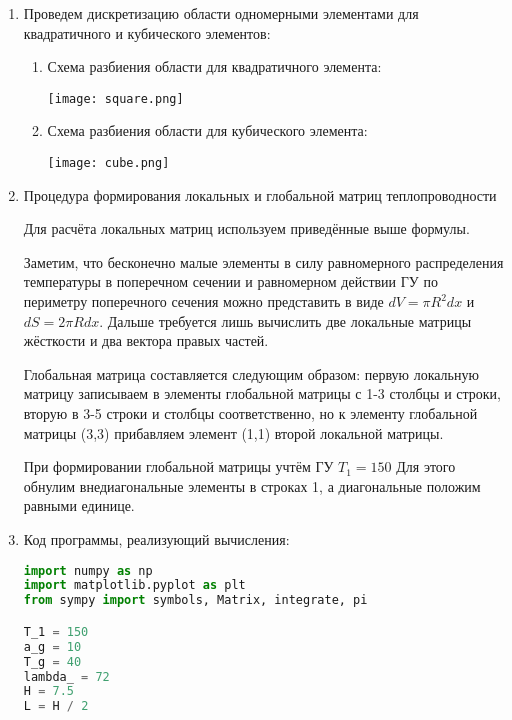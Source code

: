 \documentclass[a4paper, 12pt]{article}
\begin{document}
\begin{enumerate}
    \item Проведем дискретизацию области одномерными элементами для квадратичного и кубического элементов:
    \begin{enumerate}
        \item Схема разбиения области для квадратичного элемента:
        \begin{center}
            \texttt{[image: square.png]}
        \end{center}
        
        \item Схема разбиения области для кубического элемента:
        \begin{center}
            \texttt{[image: cube.png]}
        \end{center}
    \end{enumerate}

    \newpage
    \item Процедура формирования локальных и глобальной матриц
    теплопроводности

    Для расчёта локальных матриц используем приведённые выше формулы.

    Заметим, что бесконечно малые элементы в силу равномерного
    распределения температуры в поперечном сечении и равномерном
    действии ГУ по периметру поперечного сечения можно представить в
    виде \(dV = \pi R^2 dx\) и \(dS = 2\pi R dx\). Дальше требуется лишь вычислить
    две локальные матрицы жёсткости и два вектора правых частей.

    Глобальная матрица составляется следующим образом: первую
    локальную матрицу записываем в элементы глобальной матрицы с 1-3
    столбцы и строки, вторую в 3-5 строки и столбцы соответственно, но к
    элементу глобальной матрицы (3,3) прибавляем элемент (1,1) второй
    локальной матрицы.

    При формировании глобальной матрицы учтём ГУ \(T_1 = 150\) Для
    этого обнулим внедиагональные элементы в строках 1, а диагональные
    положим равными единице.

    \item Код программы, реализующий вычисления:
    
    \begin{lstlisting}[language=Python]
import numpy as np
import matplotlib.pyplot as plt
from sympy import symbols, Matrix, integrate, pi

T_1 = 150
a_g = 10
T_g = 40
lambda_ = 72
H = 7.5
L = H / 2


\end{lstlisting}
\end{enumerate}
\end{document}
